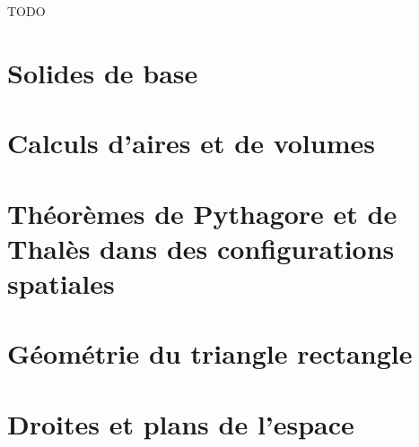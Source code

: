 TODO

\section{Solides de base}
\section{Calculs d'aires et de volumes}
\section{Théorèmes de Pythagore et de Thalès dans des configurations spatiales}
\section{Géométrie du triangle rectangle}
\section{Droites et plans de l'espace}

